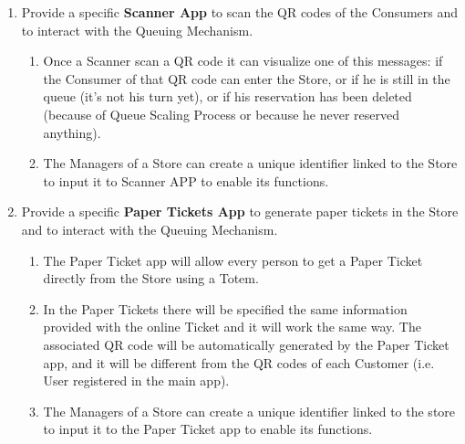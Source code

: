 \documentclass[a4paper, 12pt, oneside]{article}
\begin{document}
\begin{enumerate}[align=left, label={R.\arabic{*}}]
    \item \label{req:scannerApp}Provide a specific \textbf{Scanner App} to scan the QR codes of the Consumers and to interact with the Queuing Mechanism.
    \begin{enumerate}[label={-}]
        \item \label{req:scannerApp:response} Once a Scanner scan a QR code it can visualize one of this messages: if the Consumer of that QR code can enter the Store, or if he is still in the queue (it's not his turn yet), or if his reservation has been deleted (because of Queue Scaling Process or because he never reserved anything).
        \item \label{req:scannerApp:createCode} The Managers of a Store can create a unique identifier linked to the Store to input it to Scanner APP to enable its functions.
    \end{enumerate}
    
    \item \label{req:paperTicketApp}Provide a specific \textbf{Paper Tickets App} to generate paper tickets in the Store and to interact with the Queuing Mechanism.
    \begin{enumerate}[label={-}]
        \item \label{req:paperTicketApp:func}The Paper Ticket app will allow every person to get a Paper Ticket directly from the Store using a Totem.
        \item \label{req:paperTicketApp:funcPaperTick}In the Paper Tickets there will be specified the same information provided with the online Ticket and it will work the same way. The associated QR code will be automatically generated by the Paper Ticket app, and it will be different from the QR codes of each Customer (i.e. User registered in the main app).
        \item \label{req:paperTicketApp:createCode}The Managers of a Store can create a unique identifier linked to the store to input it to the Paper Ticket app to enable its functions.
    \end{enumerate}
    

\end{enumerate}
\end{document}

